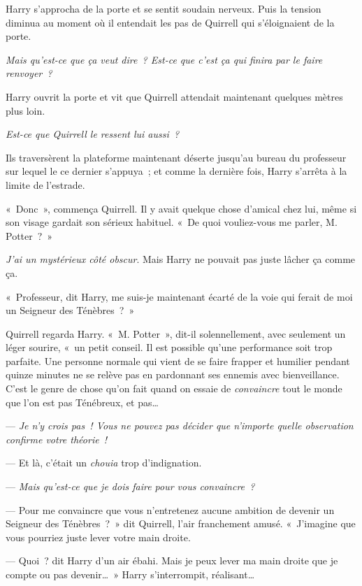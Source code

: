 Harry s'approcha de la porte et se sentit soudain nerveux.
Puis la tension diminua au moment où il entendait les pas de Quirrell qui s'éloignaient de la porte.

\emph{Mais qu'est-ce que ça veut dire~?
Est-ce que c'est ça qui finira par le faire renvoyer~?}

Harry ouvrit la porte et vit que Quirrell attendait maintenant quelques mètres plus loin.

\emph{Est-ce que Quirrell le ressent lui aussi~?}

Ils traversèrent la plateforme maintenant déserte jusqu'au bureau du professeur sur lequel le ce dernier s'appuya~; et comme la dernière fois, Harry s'arrêta à la limite de l'estrade.

«~Donc~», commença Quirrell.
Il y avait quelque chose d'amical chez lui, même si son visage gardait son sérieux habituel.
«~De quoi vouliez-vous me parler, M. Potter~?~»

\emph{J'ai un mystérieux côté obscur}.
Mais Harry ne pouvait pas juste lâcher ça comme ça.

«~Professeur, dit Harry, me suis-je maintenant écarté de la voie qui ferait de moi un Seigneur des Ténèbres~?~»

Quirrell regarda Harry.
«~M. Potter~», dit-il solennellement, avec seulement un léger sourire, «~un petit conseil.
Il est possible qu'une performance soit trop parfaite.
Une personne normale qui vient de se faire frapper et humilier pendant quinze minutes ne se relève pas en pardonnant ses ennemis avec bienveillance.
C'est le genre de chose qu'on fait quand on essaie de \emph{convaincre} tout le monde que l'on est pas Ténébreux, et pas…

--- \emph{Je n'y crois pas~!
Vous ne pouvez pas décider que n'importe quelle observation confirme votre théorie~!}

--- Et là, c'était un \emph{chouia} trop d'indignation.

--- \emph{Mais qu'est-ce que je dois faire pour vous convaincre~?}

--- Pour me convaincre que vous n'entretenez aucune ambition de devenir un Seigneur des Ténèbres~?~»
dit Quirrell, l'air franchement amusé.
«~J'imagine que vous pourriez juste lever votre main droite.

--- Quoi~? dit Harry d'un air ébahi.
Mais je peux lever ma main droite que je compte ou pas devenir…~»
Harry s'interrompit, réalisant…

